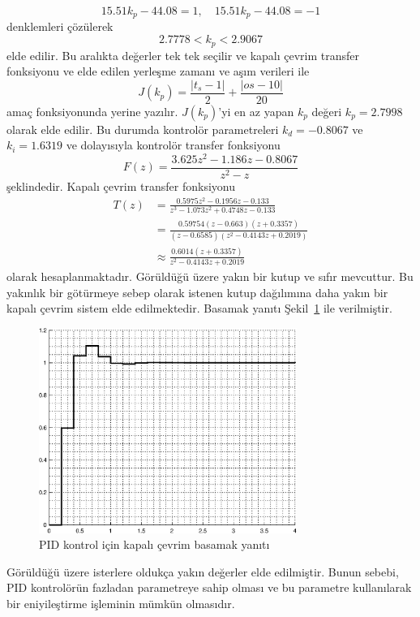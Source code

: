 \begin{equation}
    15.51k_p-44.08=1,\quad 15.51k_p-44.08=-1
\end{equation}
denklemleri çözülerek 
\begin{equation}
    2.7778<k_p<2.9067
\end{equation}
elde edilir. Bu aralıkta değerler tek tek seçilir ve kapalı çevrim transfer fonksiyonu ve elde edilen yerleşme zamanı ve aşım verileri ile 
\begin{equation}
    J(k_p)=\frac{|t_s-1|}{2}+\frac{|os-10|}{20}
\end{equation}
amaç fonksiyonunda yerine yazılır. $J(k_p)$'yi en az yapan $k_p$ değeri $k_p=2.7998$ olarak elde edilir. Bu durumda kontrolör parametreleri $k_d=-0.8067$ ve $k_i=1.6319$ ve dolayısıyla kontrolör transfer fonksiyonu
\begin{equation}
    F(z)=\frac{3.625 z^2 - 1.186 z - 0.8067}{ z^2 - z}
\end{equation}
şeklindedir. Kapalı çevrim transfer fonksiyonu 
\begin{equation}
\begin{split}
    T(z)&=\frac{0.5975 z^2 - 0.1956 z - 0.133}{z^3 - 1.073 z^2 + 0.4748 z - 0.133}\\
    &=\frac{0.59754 (z-0.663) (z+0.3357)}{(z-0.6585) (z^2 - 0.4143z + 0.2019)}\\
    &\approx\frac{0.6014(z+0.3357)}{z^2 - 0.4143z + 0.2019}
\end{split}
\end{equation}
olarak hesaplanmaktadır. Görüldüğü üzere yakın bir kutup ve sıfır mevcuttur. Bu yakınlık bir götürmeye sebep olarak istenen kutup dağılımına daha yakın bir kapalı çevrim sistem elde edilmektedir. Basamak yanıtı Şekil~\ref{fig:lec6_step4} ile verilmiştir.

\begin{figure}[!htb]
    \centering
    \includegraphics[width=0.75\textwidth]{img/lec6_step4}
    \caption{PID kontrol için kapalı çevrim basamak yanıtı}
    \label{fig:lec6_step4}
\end{figure}

Görüldüğü üzere isterlere oldukça yakın değerler elde edilmiştir. Bunun sebebi, PID kontrolörün fazladan parametreye sahip olması ve bu parametre kullanılarak bir eniyileştirme işleminin mümkün olmasıdır.